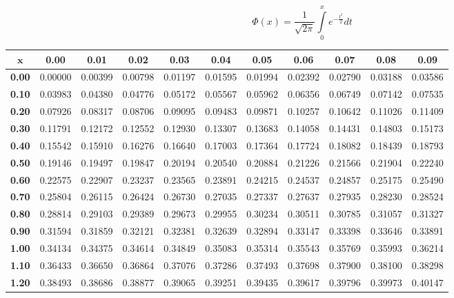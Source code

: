 
$$\Phi(x) = \frac{1}{\sqrt{2 \pi}} \int\limits_0^x e^{-\frac{t^2}{2}} dt$$
\noindent \begin{tabular}{|c|c|c|c|c|c|c|c|c|c|c|}
\hline
$\pmb{x}$ & \textbf{ 0.00 } & \textbf{ 0.01 } & \textbf{ 0.02 } & \textbf{ 0.03 } & \textbf{ 0.04 } & \textbf{ 0.05 } & \textbf{ 0.06 } & \textbf{ 0.07 } & \textbf{ 0.08 } & \textbf{ 0.09 } \\ 
 \hline 
\textbf{ 0.00 } & 0.00000 & 0.00399 & 0.00798 & 0.01197 & 0.01595 & 0.01994 & 0.02392 & 0.02790 & 0.03188 & 0.03586\\ 
\hline
\textbf{ 0.10 } & 0.03983 & 0.04380 & 0.04776 & 0.05172 & 0.05567 & 0.05962 & 0.06356 & 0.06749 & 0.07142 & 0.07535\\ 
\hline
\textbf{ 0.20 } & 0.07926 & 0.08317 & 0.08706 & 0.09095 & 0.09483 & 0.09871 & 0.10257 & 0.10642 & 0.11026 & 0.11409\\ 
\hline
\textbf{ 0.30 } & 0.11791 & 0.12172 & 0.12552 & 0.12930 & 0.13307 & 0.13683 & 0.14058 & 0.14431 & 0.14803 & 0.15173\\ 
\hline
\textbf{ 0.40 } & 0.15542 & 0.15910 & 0.16276 & 0.16640 & 0.17003 & 0.17364 & 0.17724 & 0.18082 & 0.18439 & 0.18793\\ 
\hline
\textbf{ 0.50 } & 0.19146 & 0.19497 & 0.19847 & 0.20194 & 0.20540 & 0.20884 & 0.21226 & 0.21566 & 0.21904 & 0.22240\\ 
\hline
\textbf{ 0.60 } & 0.22575 & 0.22907 & 0.23237 & 0.23565 & 0.23891 & 0.24215 & 0.24537 & 0.24857 & 0.25175 & 0.25490\\ 
\hline
\textbf{ 0.70 } & 0.25804 & 0.26115 & 0.26424 & 0.26730 & 0.27035 & 0.27337 & 0.27637 & 0.27935 & 0.28230 & 0.28524\\ 
\hline
\textbf{ 0.80 } & 0.28814 & 0.29103 & 0.29389 & 0.29673 & 0.29955 & 0.30234 & 0.30511 & 0.30785 & 0.31057 & 0.31327\\ 
\hline
\textbf{ 0.90 } & 0.31594 & 0.31859 & 0.32121 & 0.32381 & 0.32639 & 0.32894 & 0.33147 & 0.33398 & 0.33646 & 0.33891\\ 
\hline
\textbf{ 1.00 } & 0.34134 & 0.34375 & 0.34614 & 0.34849 & 0.35083 & 0.35314 & 0.35543 & 0.35769 & 0.35993 & 0.36214\\ 
\hline
\textbf{ 1.10 } & 0.36433 & 0.36650 & 0.36864 & 0.37076 & 0.37286 & 0.37493 & 0.37698 & 0.37900 & 0.38100 & 0.38298\\ 
\hline
\textbf{ 1.20 } & 0.38493 & 0.38686 & 0.38877 & 0.39065 & 0.39251 & 0.39435 & 0.39617 & 0.39796 & 0.39973 & 0.40147\\ 

\end{tabular}
